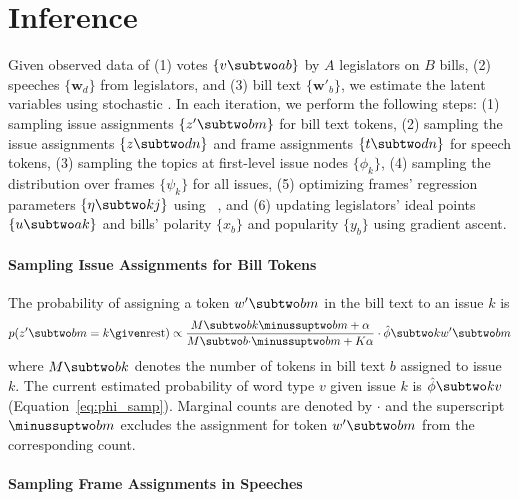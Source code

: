 \section{Inference}
\label{sec:c6_inference}


Given observed data of (1) votes $\{v \subtwo ab\}$ by $A$ legislators
on $B$ bills, (2) speeches $\{\bm w_d\}$ from legislators, and
(3) bill text $\{\bm w'_b\}$, we estimate the latent variables using stochastic
. In each iteration, we perform the following steps: (1) sampling issue assignments
$\{z' \subtwo bm\}$ for bill text tokens, (2) sampling the
issue assignments $\{z \subtwo dn\}$ and frame assignments $\{t
\subtwo dn\}$ for speech tokens, (3) sampling the topics at
first-level issue nodes $\{\phi_k\}$, (4) sampling the distribution
over frames $\{\psi_k\}$ for all issues, (5) optimizing frames'
regression parameters $\{\eta \subtwo kj\}$ using
~\cite{Liu:MP89:lbfgs}, and (6) updating legislators' ideal points $\{u \subtwo ak\}$ and bills'
polarity $\{x_b\}$ and popularity $\{y_b\}$ using gradient ascent.

\paragraph{Sampling Issue Assignments for Bill Tokens}
\label{subsec:c6_sample_zprime}

The probability of assigning a token $w' \subtwo bm$ in the bill text
to an issue $k$ is
\begin{equation}
  p(z' \subtwo bm = k \given \mbox{rest}) \propto
  \frac{M \subtwo bk \minussuptwo bm + \alpha}{M \subtwo b{\cdot} \minussuptwo bm + K \alpha} \cdot
  \hat{\phi} \subtwo k{w' \subtwo bm}
\end{equation}
where $M \subtwo bk$ denotes the number of tokens in bill text $b$
assigned to issue $k$.  The current estimated probability of
word type $v$ given issue $k$ is $\hat{\phi} \subtwo kv$
(Equation~\ref{eq:phi_samp}). Marginal counts are denoted by $\cdot$
and the superscript $\minussuptwo bm$ excludes the assignment for
token $w' \subtwo bm$ from the corresponding count.

\paragraph{Sampling Frame Assignments in Speeches}
\label{subsec:c6_sample_zt}

